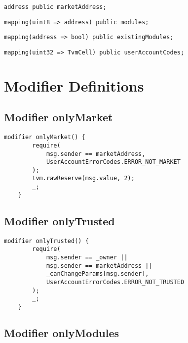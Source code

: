 \begin{lstlisting}[firstnumber=28]
    address public marketAddress;
\end{lstlisting}

\begin{lstlisting}[firstnumber=29]
    mapping(uint8 => address) public modules;
\end{lstlisting}

\begin{lstlisting}[firstnumber=30]
    mapping(address => bool) public existingModules;
\end{lstlisting}

\begin{lstlisting}[firstnumber=31]
    mapping(uint32 => TvmCell) public userAccountCodes;
\end{lstlisting}

\section{Modifier Definitions}


\subsection{Modifier onlyMarket}


\begin{lstlisting}[firstnumber=557]
    modifier onlyMarket() {
        require(
            msg.sender == marketAddress,
            UserAccountErrorCodes.ERROR_NOT_MARKET
        );
        tvm.rawReserve(msg.value, 2);
        _;
    }
\end{lstlisting}

\subsection{Modifier onlyTrusted}


\begin{lstlisting}[firstnumber=566]
    modifier onlyTrusted() {
        require(
            msg.sender == _owner ||
            msg.sender == marketAddress ||
            _canChangeParams[msg.sender],
            UserAccountErrorCodes.ERROR_NOT_TRUSTED
        );
        _;
    }
\end{lstlisting}

\subsection{Modifier onlyModules}


